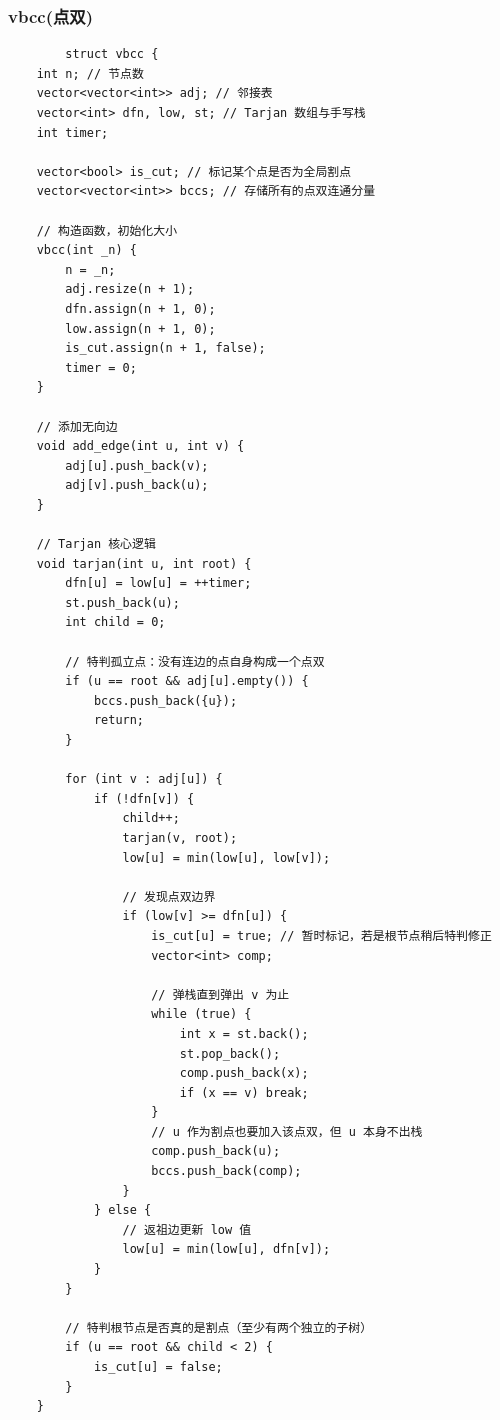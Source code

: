 \documentclass[10pt, a4paper, twocolumn]{article} %
\begin{document}
    \subsubsection{vbcc(点双)}
    \begin{lstlisting}
        struct vbcc {
    int n; // 节点数
    vector<vector<int>> adj; // 邻接表
    vector<int> dfn, low, st; // Tarjan 数组与手写栈
    int timer;
    
    vector<bool> is_cut; // 标记某个点是否为全局割点
    vector<vector<int>> bccs; // 存储所有的点双连通分量

    // 构造函数，初始化大小
    vbcc(int _n) {
        n = _n;
        adj.resize(n + 1);
        dfn.assign(n + 1, 0);
        low.assign(n + 1, 0);
        is_cut.assign(n + 1, false);
        timer = 0;
    }

    // 添加无向边
    void add_edge(int u, int v) {
        adj[u].push_back(v);
        adj[v].push_back(u);
    }

    // Tarjan 核心逻辑
    void tarjan(int u, int root) {
        dfn[u] = low[u] = ++timer;
        st.push_back(u);
        int child = 0;

        // 特判孤立点：没有连边的点自身构成一个点双
        if (u == root && adj[u].empty()) {
            bccs.push_back({u});
            return;
        }

        for (int v : adj[u]) {
            if (!dfn[v]) {
                child++;
                tarjan(v, root);
                low[u] = min(low[u], low[v]);

                // 发现点双边界
                if (low[v] >= dfn[u]) {
                    is_cut[u] = true; // 暂时标记，若是根节点稍后特判修正
                    vector<int> comp;
                    
                    // 弹栈直到弹出 v 为止
                    while (true) {
                        int x = st.back();
                        st.pop_back();
                        comp.push_back(x);
                        if (x == v) break;
                    }
                    // u 作为割点也要加入该点双，但 u 本身不出栈
                    comp.push_back(u);
                    bccs.push_back(comp);
                }
            } else {
                // 返祖边更新 low 值
                low[u] = min(low[u], dfn[v]);
            }
        }

        // 特判根节点是否真的是割点（至少有两个独立的子树）
        if (u == root && child < 2) {
            is_cut[u] = false;
        }
    }


\end{lstlisting}
\end{document}
